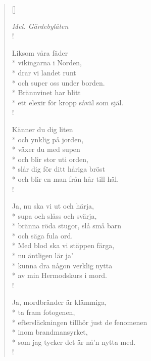 
\settowidth{\versewidth}{bränna röda stugor, slå små barn}



\begin{verse}[\versewidth]

\flagverse{}
\emph{Mel. Gärdebylåten}\\!

Liksom våra fäder\\*
vikingarna i Norden,\\*
drar vi landet runt\\*
och super oss under borden.\\*
Brännvinet har blitt\\*
ett elexir för kropp såväl som själ.\\!


Känner du dig liten\\*
och ynklig på jorden,\\*
växer du med supen\\*
och blir stor uti orden,\\*
slår dig för ditt håriga bröst\\*
och blir en man från hår till häl.\\!


Ja, nu ska vi ut och härja,\\*
supa och slåss och svärja,\\*
bränna röda stugor, slå små barn\\*
och säga fula ord.\\*
Med blod ska vi stäppen färga,\\*
nu äntligen lär ja'\\*
kunna dra någon verklig nytta\\*
av min Hermodskurs i mord.\\!


Ja, mordbränder är klämmiga,\\*
ta fram fotogenen,\\*
eftersläckningen tillhör just de fenomenen\\*
inom brandmansyrket,\\*
som jag tycker det är nå'n nytta med.\\!


\end{verse}
